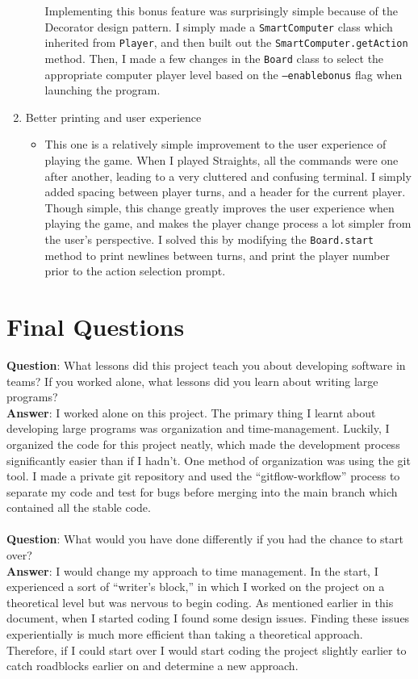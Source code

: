 \documentclass[12pt]{article}
\begin{document}
\begin{enumerate}
\begin{itemize}
						Implementing this bonus feature was surprisingly simple because of the Decorator design pattern. I simply made a \texttt{SmartComputer} class which inherited from \texttt{Player}, and then built out the \texttt{SmartComputer.getAction} method. Then, I made a few changes in the \texttt{Board} class to select the appropriate computer player level based on the \texttt{--enablebonus} flag when launching the program.
				\end{itemize}
			\item Better printing and user experience
				\begin{itemize}
					\item This one is a relatively simple improvement to the user experience of playing the game.
						When I played Straights, all the commands were one after another, leading to a very cluttered and confusing terminal.
						I simply added spacing between player turns, and a header for the current player. Though simple, this change greatly improves the user experience when playing the game, and makes the player change process a lot simpler from the user's perspective. I solved this by modifying the \texttt{Board.start} method to print newlines between turns, and print the player number prior to the action selection prompt.
				\end{itemize}
		\end{enumerate}
	\section{Final Questions}
		{\bf Question}: What lessons did this project teach you about developing software in teams? If you worked alone, what lessons did you learn about writing large programs?\\
		{\bf Answer}: I worked alone on this project. The primary thing I learnt about developing large programs was organization and time-management. Luckily, I organized the code for this project neatly, which made the development process significantly easier than if I hadn't. One method of organization was using the git tool. I made a private git repository and used the ``gitflow-workflow'' process to separate my code and test for bugs before merging into the main branch which contained all the stable code.
		\\\\
		{\bf Question}: What would you have done differently if you had the chance to start over?\\
		{\bf Answer}: I would change my approach to time management. In the start, I experienced a sort of ``writer's block,'' in which I worked on the project on a theoretical level but was nervous to begin coding. As mentioned earlier in this document, when I started coding I found some design issues. Finding these issues experientially is much more efficient than taking a theoretical approach. Therefore, if I could start over I would start coding the project slightly earlier to catch roadblocks earlier on and determine a new approach.
\end{document}
